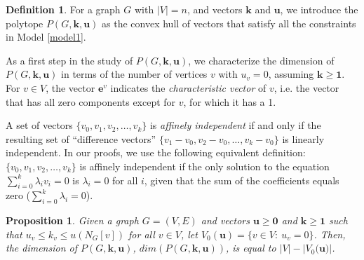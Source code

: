 \documentclass[preprint,12pt]{article}
\renewcommand{\leq}{\leqslant}
\renewcommand{\geq}{\geqslant}
\newtheorem{proposition}[theorem]{Proposition}
\theoremstyle{definition}
\newtheorem{definition}{Definition}[section]
\begin{document}
\begin{definition}
For a graph $G$ with $|V|=n$, and vectors $\mathbf{k}$ and $\mathbf{u}$, we introduce the polytope
$P(G,\mathbf{k},\mathbf{u})$ as the convex hull of vectors that satisfy all the constraints in Model \ref{model1}. 
\end{definition}


As a first step in the study of $P(G,\mathbf{k},\mathbf{u})$, we characterize the dimension of $P(G,\mathbf{k},\mathbf{u})$  in terms of the number of vertices $v$ with $u_v=0$, assuming $\mathbf{k}\geq \mathbf{1}$.
 For $v\in V$, the vector $\mathbf{e}^{v}$ indicates the \emph{characteristic vector} of $v$, i.e. the vector that has all zero components except for $v$, for which it has a 1. 

A set of vectors $\{v_0, v_1, v_2, \dots, v_k\}$ is \emph{affinely independent} if and only if the resulting set of ``difference vectors'' $\{v_1 - v_0, v_2 - v_0, \dots, v_k - v_0\}$ is linearly independent. In our proofs, we use the following equivalent definition: $\{v_0, v_1, v_2, \dots, v_k\}$ is  affinely independent if the only solution to the equation $\sum_{i=0}^k \lambda_i v_i = 0$ is $\lambda_i = 0$ for all $i$, given that the sum of the coefficients equals zero ($\sum_{i=0}^k \lambda_i = 0$). 


\begin{proposition}\label{prop:dimensionofP}
Given a graph $G=(V,E)$ and vectors $\mathbf{u}\geq \mathbf{0}$ and $\mathbf{k}\geq \mathbf{1}$ such that  $u_v\leq k_v\leq u(N_G[v])$  for all $v\in V$, let  $V_0(\mathbf{u})=\{v\in V:\ u_v=0\}$. Then, the dimension of $P(G,\mathbf{k},\mathbf{u})$, 
$dim(P(G,\mathbf{k},\mathbf{u}))$, is equal to $|V|-|V_0(\mathbf{u)}|$.
\end{proposition}
\end{document}
